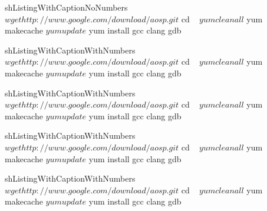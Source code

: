 \begin{ListingWithCaptionNoNumbers}{sh}{ListingWithCaptionNoNumbers}
$ wget http://www.google.com/download/aosp.git
$ cd ~
$ yum clean all
$ yum makecache
$ yum update
$ yum install gcc clang gdb
\end{ListingWithCaptionNoNumbers}

\begin{ListingWithCaptionWithNumbers}{sh}{ListingWithCaptionWithNumbers}
$ wget http://www.google.com/download/aosp.git
$ cd ~
$ yum clean all
$ yum makecache
$ yum update
$ yum install gcc clang gdb
\end{ListingWithCaptionWithNumbers}

\begin{ListingWithCaptionWithNumbers}{sh}{ListingWithCaptionWithNumbers}
$ wget http://www.google.com/download/aosp.git
$ cd ~
$ yum clean all
$ yum makecache
$ yum update
$ yum install gcc clang gdb
\end{ListingWithCaptionWithNumbers}

\begin{ListingWithCaptionWithNumbers}{sh}{ListingWithCaptionWithNumbers}
$ wget http://www.google.com/download/aosp.git
$ cd ~
$ yum clean all
$ yum makecache
$ yum update
$ yum install gcc clang gdb
\end{ListingWithCaptionWithNumbers}

\begin{ListingWithCaptionWithNumbers}{sh}{ListingWithCaptionWithNumbers}
$ wget http://www.google.com/download/aosp.git
$ cd ~
$ yum clean all
$ yum makecache
$ yum update
$ yum install gcc clang gdb
\end{ListingWithCaptionWithNumbers}